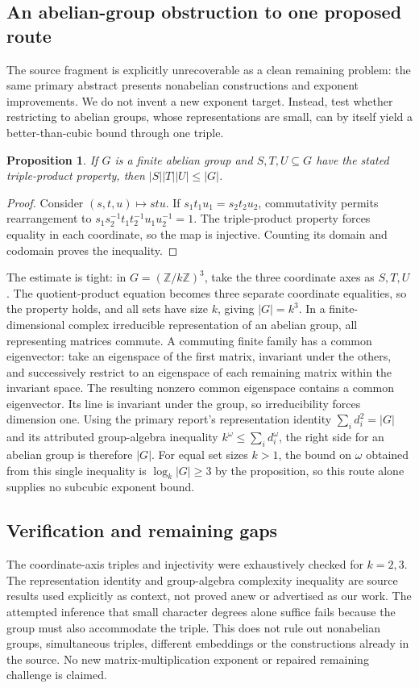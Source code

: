 \documentclass[11pt]{article}
\newtheorem{proposition}{Proposition}
\begin{document}
\subsection{An abelian-group obstruction to one proposed route}
The source fragment is explicitly unrecoverable as a clean remaining problem: the same primary abstract presents nonabelian constructions and exponent improvements. We do not invent a new exponent target. Instead, test whether restricting to abelian groups, whose representations are small, can by itself yield a better-than-cubic bound through one triple.
\begin{proposition}
If $G$ is a finite abelian group and $S,T,U\subseteq G$ have the stated triple-product property, then $|S||T||U|\le|G|$.
\end{proposition}
\begin{proof}
Consider $(s,t,u)\mapsto stu$. If $s_1t_1u_1=s_2t_2u_2$, commutativity permits rearrangement to $s_1s_2^{-1}t_1t_2^{-1}u_1u_2^{-1}=1$. The triple-product property forces equality in each coordinate, so the map is injective. Counting its domain and codomain proves the inequality.
\end{proof}
The estimate is tight: in $G=(\mathbb Z/k\mathbb Z)^3$, take the three coordinate axes as $S,T,U$. The quotient-product equation becomes three separate coordinate equalities, so the property holds, and all sets have size $k$, giving $|G|=k^3$.
In a finite-dimensional complex irreducible representation of an abelian group, all representing matrices commute. A commuting finite family has a common eigenvector: take an eigenspace of the first matrix, invariant under the others, and successively restrict to an eigenspace of each remaining matrix within the invariant space. The resulting nonzero common eigenspace contains a common eigenvector. Its line is invariant under the group, so irreducibility forces dimension one. Using the primary report's representation identity $\sum_i d_i^2=|G|$ and its attributed group-algebra inequality $k^\omega\le\sum_i d_i^\omega$, the right side for an abelian group is therefore $|G|$. For equal set sizes $k>1$, the bound on $\omega$ obtained from this single inequality is $\log_k|G|\ge3$ by the proposition, so this route alone supplies no subcubic exponent bound.
\subsection{Verification and remaining gaps}
The coordinate-axis triples and injectivity were exhaustively checked for $k=2,3$. The representation identity and group-algebra complexity inequality are source results used explicitly as context, not proved anew or advertised as our work. The attempted inference that small character degrees alone suffice fails because the group must also accommodate the triple. This does not rule out nonabelian groups, simultaneous triples, different embeddings or the constructions already in the source. No new matrix-multiplication exponent or repaired remaining challenge is claimed.
\end{document}

